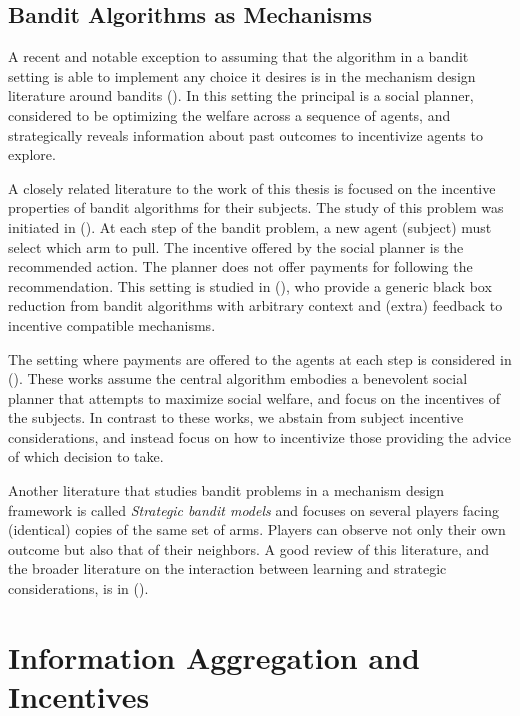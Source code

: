 \subsection{Bandit Algorithms as Mechanisms}


A recent and notable exception to assuming that the algorithm in a bandit setting is able to implement any choice it desires is in the mechanism design literature around bandits (\cite{kremer2014implementing,mansour2015bayesian}).
In this setting the principal is a social planner,  considered to be optimizing the welfare across a sequence of agents, and strategically reveals information about past outcomes to incentivize agents to explore.

A closely related literature to the work of this thesis is focused on the incentive properties of bandit algorithms for their subjects.
The study of this problem was initiated in (\cite{kremer2014implementing}).
At each step of the bandit problem, a new agent (subject) must select which arm to pull. 
The  incentive offered by the social planner is the recommended action. The planner does not offer payments for following the recommendation. %
This setting is studied in (\cite{mansour2015bayesian}), who provide a generic black box reduction from bandit algorithms with arbitrary context and (extra) feedback to incentive compatible mechanisms.

The setting where payments are offered to the agents at each step is considered in (\cite{frazier2014incentivizing}).
These works assume the central algorithm embodies a benevolent social planner that attempts to maximize social welfare, and focus on the incentives of the subjects.
In contrast to these works, we abstain from subject incentive considerations, and instead focus on how to incentivize those providing the advice of which decision to take.

Another literature that studies bandit problems in a mechanism design framework is called \emph{Strategic bandit models} and focuses on several players facing (identical) copies of the same set of arms. Players can observe not only their own outcome but also that of their neighbors. A good review of this literature, and the broader literature on the interaction between learning and strategic considerations, is in (\cite{horner2016learning}).

\section{Information Aggregation and Incentives}



